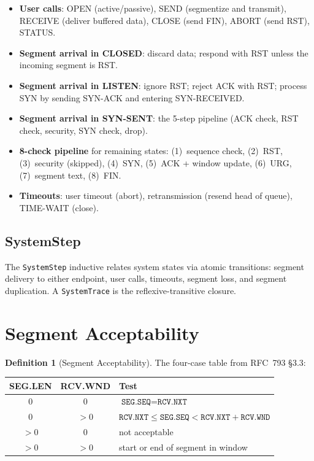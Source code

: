 \documentclass[11pt]{article}
\theoremstyle{definition}
\newtheorem{definition}{Definition}[section]
\begin{document}
\begin{itemize}
  \item \textbf{User calls}: OPEN (active/passive), SEND (segmentize and
    transmit), RECEIVE (deliver buffered data), CLOSE (send FIN), ABORT
    (send RST), STATUS.
  \item \textbf{Segment arrival in CLOSED}: discard data; respond with RST
    unless the incoming segment is RST.
  \item \textbf{Segment arrival in LISTEN}: ignore RST; reject ACK with RST;
    process SYN by sending SYN-ACK and entering SYN-RECEIVED.
  \item \textbf{Segment arrival in SYN-SENT}: the 5-step pipeline (ACK check,
    RST check, security, SYN check, drop).
  \item \textbf{8-check pipeline} for remaining states: (1)~sequence check,
    (2)~RST, (3)~security (skipped), (4)~SYN, (5)~ACK + window update,
    (6)~URG, (7)~segment text, (8)~FIN.
  \item \textbf{Timeouts}: user timeout (abort), retransmission (resend head
    of queue), TIME-WAIT (close).
\end{itemize}

\subsection{SystemStep}

The \texttt{SystemStep} inductive relates system states via atomic transitions:
segment delivery to either endpoint, user calls, timeouts, segment loss, and
segment duplication. A \texttt{SystemTrace} is the reflexive-transitive closure.

\section{Segment Acceptability}
\label{sec:acceptability}

\begin{definition}[Segment Acceptability]
The four-case table from RFC~793 \S3.3:

\begin{center}
\begin{tabular}{ccl}
\textbf{SEG.LEN} & \textbf{RCV.WND} & \textbf{Test} \\
\hline
0 & 0 & $\texttt{SEG.SEQ} = \texttt{RCV.NXT}$ \\
0 & $>0$ & $\texttt{RCV.NXT} \leq \texttt{SEG.SEQ} < \texttt{RCV.NXT} + \texttt{RCV.WND}$ \\
$>0$ & 0 & not acceptable \\
$>0$ & $>0$ & start or end of segment in window \\
\end{tabular}
\end{center}
\end{definition}
\end{document}
